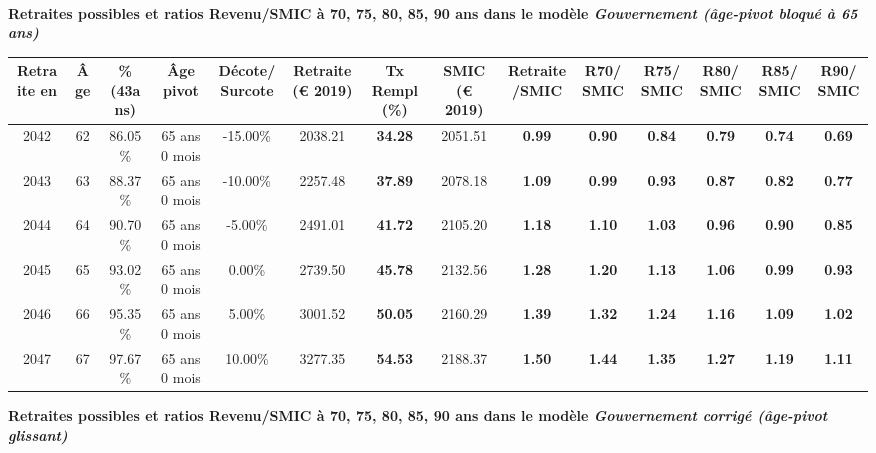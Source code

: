  ~\\{\bf \noindent Retraites possibles et ratios Revenu/SMIC à 70, 75, 80, 85, 90 ans dans le modèle \emph{Gouvernement (âge-pivot bloqué à 65 ans)}}  
 
\begin{adjustbox}{max width=\textwidth} 
\begin{tabular}[htb]{|c|c||c|c|c||c|c||c|c||c|c|c|c|c|} 
\hline 
 Retraite en &  Âge &  \%(43ans) &  Âge pivot &  Décote/Surcote &  Retraite (\euro{} 2019) &  Tx Rempl(\%) &  SMIC (\euro{} 2019) &  Retraite/SMIC &  R70/SMIC &  R75/SMIC &  R80/SMIC &  R85/SMIC &  R90/SMIC \\ 
\hline \hline 
 2042 &  62 &  86.05\% &  65 ans 0 mois &  -15.00\% &  2038.21 &  {\bf 34.28} &  2051.51 &  {\bf {\color{red} 0.99}} &  {\bf {\color{red} 0.90}} &  {\bf {\color{red} 0.84}} &  {\bf {\color{red} 0.79}} &  {\bf {\color{red} 0.74}} &  {\bf {\color{red} 0.69}} \\ 
\hline 
 2043 &  63 &  88.37\% &  65 ans 0 mois &  -10.00\% &  2257.48 &  {\bf 37.89} &  2078.18 &  {\bf 1.09} &  {\bf {\color{red} 0.99}} &  {\bf {\color{red} 0.93}} &  {\bf {\color{red} 0.87}} &  {\bf {\color{red} 0.82}} &  {\bf {\color{red} 0.77}} \\ 
\hline 
 2044 &  64 &  90.70\% &  65 ans 0 mois &  -5.00\% &  2491.01 &  {\bf 41.72} &  2105.20 &  {\bf 1.18} &  {\bf 1.10} &  {\bf 1.03} &  {\bf {\color{red} 0.96}} &  {\bf {\color{red} 0.90}} &  {\bf {\color{red} 0.85}} \\ 
\hline 
 2045 &  65 &  93.02\% &  65 ans 0 mois &  0.00\% &  2739.50 &  {\bf 45.78} &  2132.56 &  {\bf 1.28} &  {\bf 1.20} &  {\bf 1.13} &  {\bf 1.06} &  {\bf {\color{red} 0.99}} &  {\bf {\color{red} 0.93}} \\ 
\hline 
 2046 &  66 &  95.35\% &  65 ans 0 mois &  5.00\% &  3001.52 &  {\bf 50.05} &  2160.29 &  {\bf 1.39} &  {\bf 1.32} &  {\bf 1.24} &  {\bf 1.16} &  {\bf 1.09} &  {\bf 1.02} \\ 
\hline 
 2047 &  67 &  97.67\% &  65 ans 0 mois &  10.00\% &  3277.35 &  {\bf 54.53} &  2188.37 &  {\bf 1.50} &  {\bf 1.44} &  {\bf 1.35} &  {\bf 1.27} &  {\bf 1.19} &  {\bf 1.11} \\ 
\hline 
\hline 
\end{tabular} 
\end{adjustbox} 
 
 \vspace{0.1cm} 
{\bf \noindent Retraites possibles et ratios Revenu/SMIC à 70, 75, 80, 85, 90 ans dans le modèle \emph{Gouvernement corrigé (âge-pivot glissant)}}  
 
